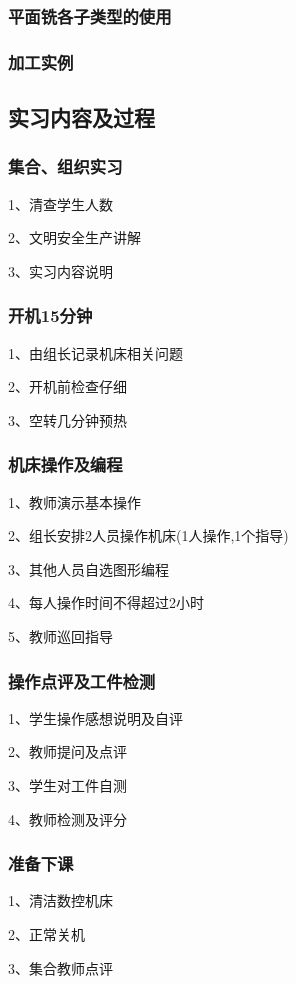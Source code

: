 \subsubsection{平面铣各子类型的使用}

\subsubsection{加工实例}


\subsection{实习内容及过程}

\subsubsection{集合、组织实习}
1、清查学生人数

2、文明安全生产讲解

3、实习内容说明
\subsubsection{开机15分钟}
1、由组长记录机床相关问题

2、开机前检查仔细

3、空转几分钟预热
\subsubsection{机床操作及编程}
1、教师演示基本操作

2、组长安排2人员操作机床(1人操作,1个指导)

3、其他人员自选图形编程

4、每人操作时间不得超过2小时

5、教师巡回指导
\subsubsection{操作点评及工件检测}
1、学生操作感想说明及自评

2、教师提问及点评

3、学生对工件自测

4、教师检测及评分
\subsubsection{准备下课}
1、清洁数控机床

2、正常关机

3、集合教师点评

